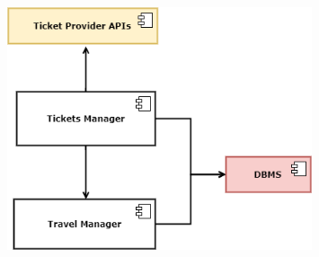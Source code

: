 \begin{figure}[H]
	\centering
	\includegraphics[width=0.8\textwidth]{Images/Test/3.png}%
\end{figure}

